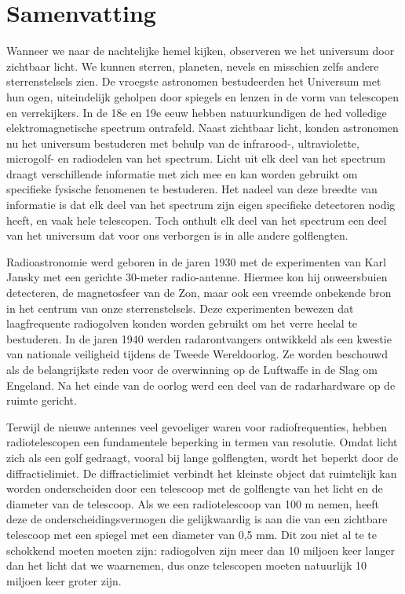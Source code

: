 \cleardoublepage 
{}
 

\chapter*{Samenvatting}\label{ch:summary_nl}

Wanneer we naar de nachtelijke hemel kijken, observeren we het universum door zichtbaar licht. We kunnen sterren, planeten, nevels en misschien zelfs andere sterrenstelsels zien. De vroegste astronomen bestudeerden het Universum met hun ogen, uiteindelijk geholpen door spiegels en lenzen in de vorm van telescopen en verrekijkers. In de 18e en 19e eeuw hebben natuurkundigen de hed volledige elektromagnetische spectrum ontrafeld. Naast zichtbaar licht, konden astronomen nu het universum bestuderen met behulp van de infrarood-, ultraviolette, microgolf- en radiodelen van het spectrum. Licht uit elk deel van het spectrum draagt verschillende informatie met zich mee en kan worden gebruikt om specifieke fysische fenomenen te bestuderen. Het nadeel van deze breedte van informatie is dat elk deel van het spectrum zijn eigen specifieke detectoren nodig heeft, en vaak hele telescopen. Toch onthult elk deel van het spectrum een deel van het universum dat voor ons verborgen is in alle andere golflengten.

Radioastronomie werd geboren in de jaren 1930 met de experimenten van Karl Jansky met een gerichte 30-meter radio-antenne. Hiermee kon hij onweersbuien detecteren, de magnetosfeer van de Zon, maar ook een vreemde onbekende bron in het centrum van onze sterrenstelsels. Deze experimenten bewezen dat laagfrequente radiogolven konden worden gebruikt om het verre heelal te bestuderen. In de jaren 1940 werden radarontvangers ontwikkeld als een kwestie van nationale veiligheid tijdens de Tweede Wereldoorlog. Ze worden beschouwd als de belangrijkste reden voor de overwinning op de Luftwaffe in de Slag om Engeland. Na het einde van de oorlog werd een deel van de radarhardware op de ruimte gericht.

Terwijl de nieuwe antennes veel gevoeliger waren voor radiofrequenties, hebben radiotelescopen een fundamentele beperking in termen van resolutie. Omdat licht zich als een golf gedraagt, vooral bij lange golflengten, wordt het beperkt door de diffractielimiet. De diffractielimiet verbindt het kleinste object dat ruimtelijk kan worden onderscheiden door een telescoop met de golflengte van het licht en de diameter van de telescoop. Als we een radiotelescoop van 100 m nemen, heeft deze de onderscheidingsvermogen die gelijkwaardig is aan die van een zichtbare telescoop met een spiegel met een diameter van 0,5 mm. Dit zou niet al te te schokkend moeten moeten zijn: radiogolven zijn meer dan 10 miljoen keer langer dan het licht dat we waarnemen, dus onze telescopen moeten natuurlijk 10 miljoen keer groter zijn.

